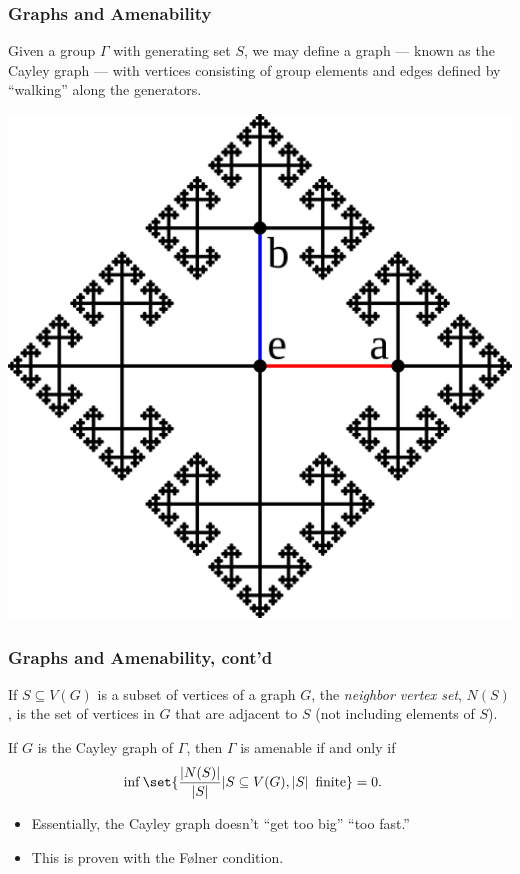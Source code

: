 \documentclass{beamer-custom}
\begin{document}
\begin{frame}
  \frametitle{Graphs and Amenability}
  Given a group $\Gamma$ with generating set $S$, we may define a graph --- known as the Cayley graph --- with vertices consisting of group elements and edges defined by ``walking'' along the generators.
  \begin{center}
    \includegraphics[scale=0.075]{images/cayley_graph.png}
  \end{center}
\end{frame}
\begin{frame}
  \frametitle{Graphs and Amenability, cont'd}
  If $S\subseteq V(G)$ is a subset of vertices of a graph $G$, the \textit{neighbor vertex set}, $N(S)$, is the set of vertices in $G$ that are adjacent to $S$ (not including elements of $S$).\newline

  If $G$ is the Cayley graph of $\Gamma$, then $\Gamma$ is amenable if and only if
  \begin{align*}
    \inf\set{\frac{\left\vert N(S) \right\vert}{\left\vert S \right\vert} | S\subseteq V(G),\left\vert S \right\vert\text{ finite}} &= 0.
  \end{align*}
  \begin{itemize}
    \item Essentially, the Cayley graph doesn't ``get too big'' ``too fast.''
    \item This is proven with the Følner condition.
  \end{itemize}
\end{frame}
\end{document}
